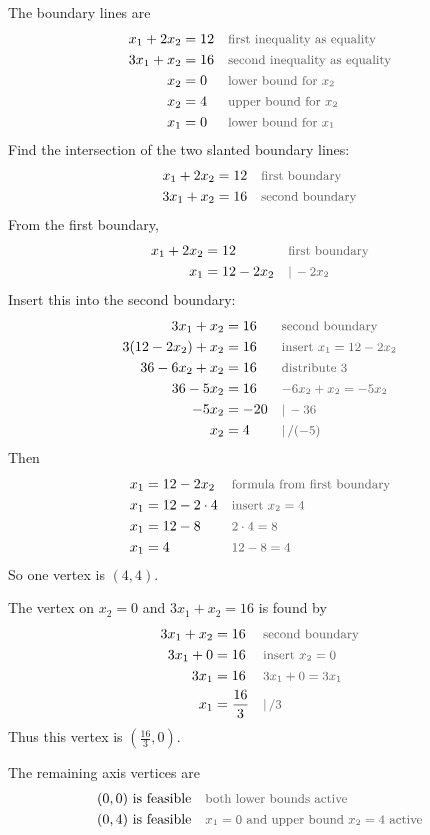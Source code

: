 \documentclass[a4paper,11pt]{article}
\newif\ifexplain
\newcommand{\why}[1]{\text{\small\color{black!65}#1}}
\newcommand{\explain}[1]{\ifexplain\begin{erklbox}#1\end{erklbox}\fi}
\begin{document}
The boundary lines are
\begin{align*}
x_1+2x_2&=12 && \why{first inequality as equality}\\
3x_1+x_2&=16 && \why{second inequality as equality}\\
x_2&=0 && \why{lower bound for $x_2$}\\
x_2&=4 && \why{upper bound for $x_2$}\\
x_1&=0 && \why{lower bound for $x_1$}
\end{align*}
Find the intersection of the two slanted boundary lines:
\begin{align*}
x_1+2x_2&=12 && \why{first boundary}\\
3x_1+x_2&=16 && \why{second boundary}
\end{align*}
From the first boundary,
\begin{align*}
x_1+2x_2&=12 && \why{first boundary}\\
x_1&=12-2x_2 && \why{$|\,-2x_2$}
\end{align*}
Insert this into the second boundary:
\begin{align*}
3x_1+x_2&=16 && \why{second boundary}\\
3(12-2x_2)+x_2&=16 && \why{insert $x_1=12-2x_2$}\\
36-6x_2+x_2&=16 && \why{distribute $3$}\\
36-5x_2&=16 && \why{$-6x_2+x_2=-5x_2$}\\
-5x_2&=-20 && \why{$|\,-36$}\\
x_2&=4 && \why{$|\,/(-5)$}
\end{align*}
Then
\begin{align*}
x_1&=12-2x_2 && \why{formula from first boundary}\\
x_1&=12-2\cdot4 && \why{insert $x_2=4$}\\
x_1&=12-8 && \why{$2\cdot4=8$}\\
x_1&=4 && \why{$12-8=4$}
\end{align*}
So one vertex is $(4,4)$.

The vertex on $x_2=0$ and $3x_1+x_2=16$ is found by
\begin{align*}
3x_1+x_2&=16 && \why{second boundary}\\
3x_1+0&=16 && \why{insert $x_2=0$}\\
3x_1&=16 && \why{$3x_1+0=3x_1$}\\
x_1&=\frac{16}{3} && \why{$|\,/3$}
\end{align*}
Thus this vertex is $\left(\frac{16}{3},0\right)$.

The remaining axis vertices are
\begin{align*}
(0,0)&\text{ is feasible} && \why{both lower bounds active}\\
(0,4)&\text{ is feasible} && \why{$x_1=0$ and upper bound $x_2=4$ active}
\end{align*}
\explain{Der Punkt $(0,6)$ aus $x_1+2x_2=12$ ist nicht zulässig, weil $x_2\le4$ gilt. Daher liegt der obere linke Eckpunkt bei $(0,4)$.}
\end{document}
